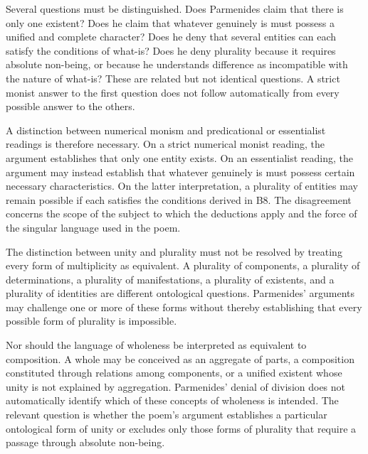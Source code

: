 
Several questions must be distinguished. Does
Parmenides claim that there is only one existent?
Does he claim that whatever genuinely is must
possess a unified and complete character? Does
he deny that several entities can each satisfy
the conditions of what-is? Does he deny plurality
because it requires absolute non-being, or because
he understands difference as incompatible with
the nature of what-is? These are related but
not identical questions. A strict monist answer
to the first question does not follow automatically
from every possible answer to the others.


A distinction between numerical monism and
predicational or essentialist readings is therefore
necessary. On a strict numerical monist reading,
the argument establishes that only one entity
exists. On an essentialist reading, the argument
may instead establish that whatever genuinely
is must possess certain necessary characteristics.
On the latter interpretation, a plurality of
entities may remain possible if each satisfies
the conditions derived in B8. The disagreement
concerns the scope of the subject to which the
deductions apply and the force of the singular
language used in the poem.


The distinction between unity and plurality
must not be resolved by treating every form
of multiplicity as equivalent. A plurality of
components, a plurality of determinations,
a plurality of manifestations, a plurality of
existents, and a plurality of identities are
different ontological questions. Parmenides'
arguments may challenge one or more of these
forms without thereby establishing that every
possible form of plurality is impossible.


Nor should the language of wholeness be
interpreted as equivalent to composition.
A whole may be conceived as an aggregate
of parts, a composition constituted through
relations among components, or a unified
existent whose unity is not explained by
aggregation. Parmenides' denial of division
does not automatically identify which of
these concepts of wholeness is intended.
The relevant question is whether the poem's
argument establishes a particular ontological
form of unity or excludes only those forms
of plurality that require a passage through
absolute non-being.

